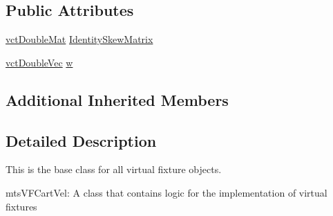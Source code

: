 \subsection*{Public Attributes}
\begin{DoxyCompactItemize}
\item 
\hyperlink{vct_dynamic_matrix_types_8h_a48f1eb2461d20a99e824ee5753a37c84}{vct\-Double\-Mat} \hyperlink{classmts_v_f_cartesian_translation_ac1142bba466b1bf454c1c5f9aed054f5}{Identity\-Skew\-Matrix}
\item 
\hyperlink{vct_dynamic_vector_types_8h_ade4b3068c86fb88f41af2e5187e491c2}{vct\-Double\-Vec} \hyperlink{classmts_v_f_cartesian_translation_acce719308f90543b9c42b923ad079df4}{w}
\end{DoxyCompactItemize}
\subsection*{Additional Inherited Members}


\subsection{Detailed Description}
This is the base class for all virtual fixture objects. 

mts\-V\-F\-Cart\-Vel\-: A class that contains logic for the implementation of virtual fixtures 

